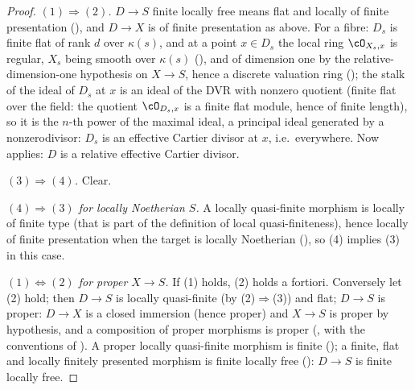 \begin{proof}
\emph{$(1)\Rightarrow(2)$.}  $D\to S$ finite locally free means flat
and locally of finite presentation (),
and $D\to X$ is of finite presentation as above.  For a fibre: $D_s$ is
finite flat of rank $d$ over $\kappa(s)$, and at a point $x\in D_s$
the local ring $\cO_{X_s,x}$ is regular, $X_s$ being smooth over
$\kappa(s)$ (), and of dimension
one by the relative-dimension-one hypothesis on $X\to S$, hence a
discrete valuation ring (); the stalk
of the ideal of $D_s$ at
$x$ is an ideal of the DVR with nonzero quotient (finite flat over the
field: the quotient $\cO_{D_s,x}$ is a finite flat module, hence of
finite length), so it is the $n$-th power of the maximal ideal, a
principal ideal generated by a nonzerodivisor: $D_s$ is an effective
Cartier divisor at $x$, i.e.\ everywhere.  Now
 applies: $D$ is a relative
effective Cartier divisor.

\emph{$(3)\Rightarrow(4)$.}  Clear.

\emph{$(4)\Rightarrow(3)$ for locally Noetherian $S$.}  A locally
quasi-finite morphism is locally of finite type (that is part of the
definition of local quasi-finiteness), hence locally of finite
presentation when the target is locally Noetherian
(), so (4)
implies (3) in this case.

\emph{$(1)\Leftrightarrow(2)$ for proper $X\to S$.}  If (1) holds,
(2) holds a fortiori.  Conversely let (2) hold; then $D\to S$ is
locally quasi-finite (by (2)$\Rightarrow$(3)) and flat; $D\to S$ is
proper: $D\to X$ is a closed immersion (hence proper) and $X\to S$ is
proper by hypothesis, and a composition of proper morphisms is proper
(, with the conventions of
).  A proper
locally quasi-finite morphism is finite
(); a finite, flat and locally
finitely presented morphism is finite locally free
():
$D\to S$ is finite locally free.
\end{proof}

